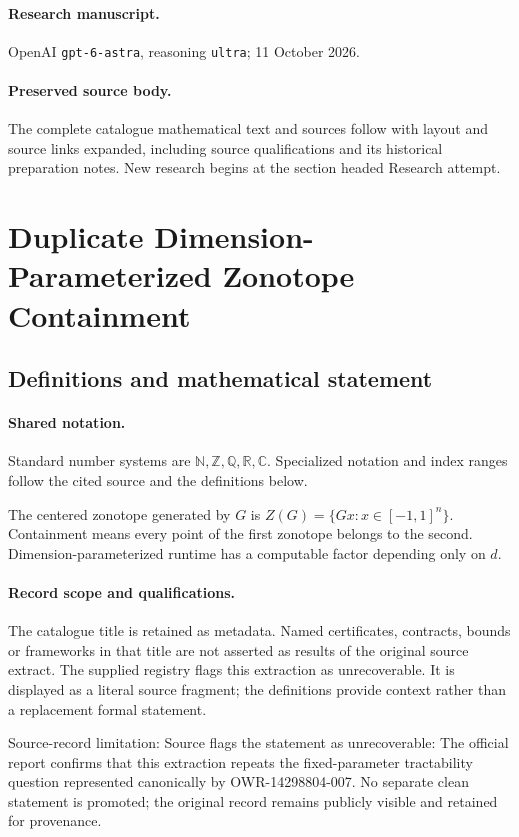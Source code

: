 \documentclass[11pt]{article}
\begin{document}
\paragraph{Research manuscript.} OpenAI \texttt{gpt-6-astra}, reasoning \texttt{ultra}; 11 October 2026.
\paragraph{Preserved source body.} The complete catalogue mathematical text and sources follow with layout and source links expanded, including source qualifications and its historical preparation notes. New research begins at the section headed Research attempt.

\section{Duplicate Dimension-Parameterized Zonotope Containment}\label{statement}

\subsection{Definitions and mathematical statement}

\paragraph{Shared notation.}Standard number systems are $\mathbb N,\mathbb Z,\mathbb Q,\mathbb R,\mathbb C$. Specialized notation and index ranges follow the cited source and the definitions below.


The centered zonotope generated by $G$ is $Z(G)=\{Gx:x\in[-1,1]^n\}$. Containment means every point of the first zonotope belongs to the second. Dimension-parameterized runtime has a computable factor depending only on $d$.
\paragraph{Record scope and qualifications.}
The catalogue title is retained as metadata. Named certificates, contracts, bounds or frameworks in that title are not asserted as results of the original source extract.
The supplied registry flags this extraction as unrecoverable. It is displayed as a literal source fragment; the definitions provide context rather than a replacement formal statement.

Source-record limitation: Source flags the statement as unrecoverable: The official report confirms that this extraction repeats the fixed-parameter tractability question represented canonically by OWR-14298804-007. No separate clean statement is promoted; the original record remains publicly visible and retained for provenance.
\end{document}
